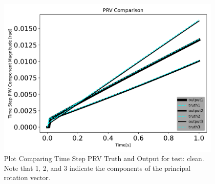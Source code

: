 \begin{figure}[htbp]\centerline{\includegraphics[height=0.7\textwidth, keepaspectratio]{AutoTeX/cleanPRVcomparison}}\caption{Plot Comparing Time Step PRV Truth and Output for test: clean. Note that 1, 2, and 3 indicate the components of the principal rotation vector.}\label{fig:cleanPRVcomparison}\end{figure}